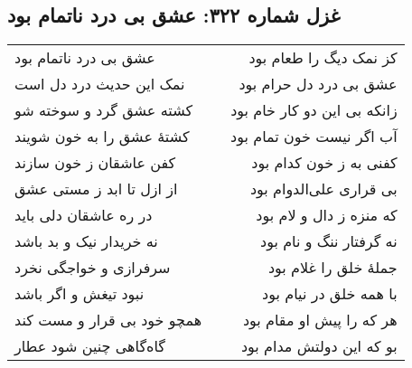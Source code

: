 \begin{center}
\section*{غزل شماره ۳۲۲: عشق بی درد ناتمام بود}
\label{sec:322}
\begin{longtable}{l p{0.5cm} r}
عشق بی درد ناتمام بود
&&
کز نمک دیگ را طعام بود
\\
نمک این حدیث درد دل است
&&
عشق بی درد دل حرام بود
\\
کشته عشق گرد و سوخته شو
&&
زانکه بی این دو کار خام بود
\\
کشتهٔ عشق را به خون شویند
&&
آب اگر نیست خون تمام بود
\\
کفن عاشقان ز خون سازند
&&
کفنی به ز خون کدام بود
\\
از ازل تا ابد ز مستی عشق
&&
بی قراری علی‌الدوام بود
\\
در ره عاشقان دلی باید
&&
که منزه ز دال و لام بود
\\
نه خریدار نیک و بد باشد
&&
نه گرفتار ننگ و نام بود
\\
سرفرازی و خواجگی نخرد
&&
جملهٔ خلق را غلام بود
\\
نبود تیغش و اگر باشد
&&
با همه خلق در نیام بود
\\
همچو خود بی قرار و مست کند
&&
هر که را پیش او مقام بود
\\
گاه‌گاهی چنین شود عطار
&&
بو که این دولتش مدام بود
\\
\end{longtable}
\end{center}
